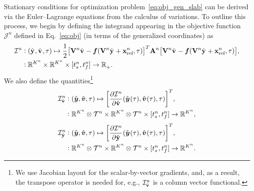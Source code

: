 Stationary conditions for optimization problem~\eqref{eq:obj_gen_slab} can be derived via 
	the Euler--Lagrange equations from the
calculus of variations. To outline this process, we begin by defining the
integrand appearing in the objective function $\mathcal{J}^n$ defined in Eq.~\eqref{eq:obj} (in terms of the generalized
coordinates) as 
\begin{equation}\label{eq:integrand}
\begin{split}
 \minintegrandArg{n} & \vcentcolon
(\genstateyDiscreteArgnt{}, \genstateyDiscreteDotArgnt{},\timeDummy) \mapsto \frac{1}{2} \big[
\basisspaceArg{n} \genstateyDiscreteDotArgnt{} - \velocity(\basisspaceArg{n} \genstateyDiscreteArgnt{}
+ \stateInterceptArg{n},\timeDummy ) \big]^T \stweightingMatArgt{n}{t} \big[
\basisspaceArg{n} \genstateyDiscreteDotArgnt{}  - \velocity(\basisspaceArg{n} \genstateyDiscreteArgnt{} +
\stateInterceptArg{n},\timeDummy) \big], \\ & \vcentcolon \RR{\romdimArg{n}} \times \RR{\romdimArg{n}} \times [\timeStartArg{n},\timeEndArg{n}]
 \rightarrow \RRplus .  
\end{split}
\end{equation}
We also define the quantities\footnote{We use Jacobian layout for the scalar-by-vector gradients, and, as a result, the transpose operator is needed for, e.g., $\dIdVArg{n}$ is a column vector functional.}
\begin{equation}
\begin{split}
\dIdVArg{n}  & \vcentcolon
(\genstatey , \genstateyDot, \timeDummy) \mapsto \bigg[ \frac{\partial \minintegrandArg{n}}{\partial \genstateyDiscreteDot} (\genstateyArg{}{\timeDummy}, \genstateyDotArg{}{\timeDummy},\timeDummy) \bigg]^T, \\ 
& \vcentcolon  \RR{\romdimArg{n}} \otimes \timeSpaceArg{n} \times \RR{\romdimArg{n}} \otimes \timeSpaceArg{n} \times [\timeStartArg{n},\timeEndArg{n}]
 \rightarrow \RR{\romdimArg{n}} ,
\end{split}
\end{equation}
\begin{equation}
\begin{split}
\dIdYArg{n}  & \vcentcolon
(\genstatey , \genstateyDot, \timeDummy) \mapsto \bigg[ \frac{\partial \minintegrandArg{n}}{\partial \genstateyDiscrete} (\genstateyArg{}{\timeDummy}, \genstateyDotArg{}{\timeDummy},\timeDummy) \bigg]^T, \\ 
& \vcentcolon  \RR{\romdimArg{n}} \otimes \timeSpaceArg{n} \times \RR{\romdimArg{n}} \otimes \timeSpaceArg{n} \times [\timeStartArg{n},\timeEndArg{n}]
 \rightarrow \RR{\romdimArg{n}} .
\end{split}
\end{equation}
